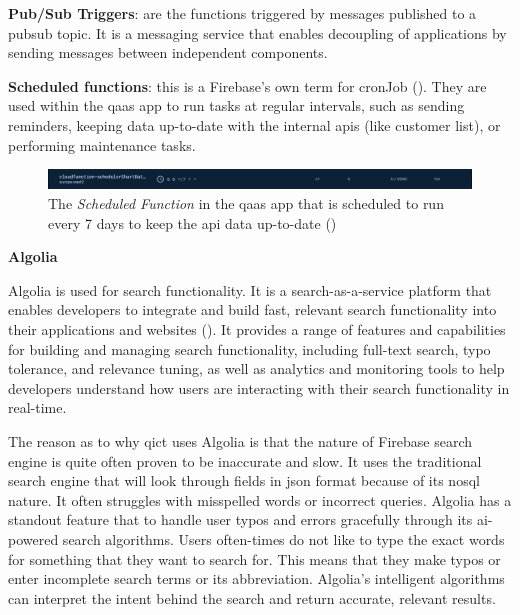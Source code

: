 \textbf{Pub/Sub Triggers}: are the functions triggered by messages published to a \acrshort{pubsub} topic.
It is a messaging service that enables decoupling of applications by sending messages between independent components.

\textbf{Scheduled functions}: this is a Firebase's own term for \gls{cronJob} (\textit{\cite{scheduleFunction}}).
They are used within the \acrshort{qaas} app to run tasks at regular intervals, such as sending reminders, keeping
data up-to-date with the internal \acrshort{api}s (like customer list), or performing maintenance tasks.

\begin{figure}[H]
      \centering
      \includegraphics[width=1.0\textwidth]{Figures/Firebase/Functions/CronJobs.png}
      \caption{The \textit{Scheduled Function}  in the \acrshort{qaas} app that is scheduled to run every 7 days to keep the \acrshort{api} data up-to-date
            (\textit{\cite{cronJobQaaSAppFunction}})}
\end{figure}

\textbf{Algolia}

Algolia is used for search functionality. It is a search-as-a-service platform that enables developers to
integrate and build fast, relevant search functionality into their applications and websites
(\textit{\cite{algolia}}). It provides a range of features and capabilities for building and managing search
functionality, including full-text search, typo tolerance, and relevance tuning, as well as analytics and
monitoring tools to help developers understand how users are interacting with their search functionality in
real-time.

The reason as to why \acrshort{qict} uses Algolia is that the nature of Firebase search engine is quite often
proven to be inaccurate and slow. It uses the traditional search engine that will look through fields in
\acrshort{json} format because of its \acrshort{nosql} nature. It often struggles with misspelled words or
incorrect queries. Algolia has a standout feature that to handle user typos and errors gracefully
through its \acrshort{ai}-powered search algorithms. Users often-times do not like to type the exact words for
something that they want to search for. This means that they make typos or enter incomplete search terms or its
abbreviation. Algolia's intelligent algorithms can interpret the intent behind the search and return accurate,
relevant results.

